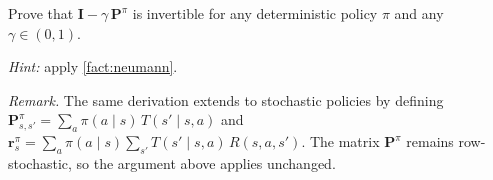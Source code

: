 \documentclass[11pt]{article}
\begin{document}
\begin{exercise}
\label{prob:exact_eval_invertible} Prove that $\mathbf{I} - \gamma\, \mathbf{P}^\pi$ is invertible for any deterministic policy $\pi$ and any $\gamma \in (0, 1)$.

\textit{Hint:} apply \cref{fact:neumann}.
\end{exercise}


\emph{Remark.} The same derivation extends to stochastic policies by defining $\mathbf{P}^\pi_{s,s'} = \sum_{a} \pi(a \mid s)\, T(s' \mid s, a)$ and $\mathbf{r}^\pi_s = \sum_{a} \pi(a \mid s) \sum_{s'} T(s' \mid s, a)\, R(s, a, s')$. The matrix $\mathbf{P}^\pi$ remains row-stochastic, so the argument above applies unchanged.





\end{document}
